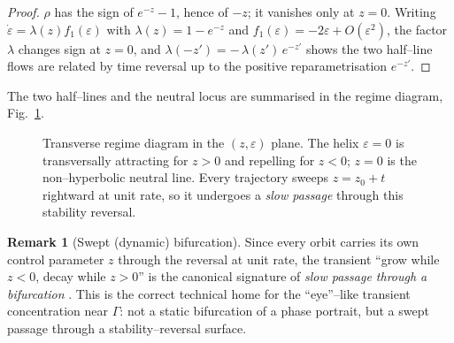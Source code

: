\documentclass[11pt]{article}
\theoremstyle{plain}
\theoremstyle{definition}
\newtheorem{remark}[theorem]{Remark}
\newcommand{\eps}{\varepsilon}
\newcommand{\Gam}{\Gamma}
\begin{document}
\begin{proof}
$\rho$ has the sign of $e^{-z}-1$, hence of $-z$; it vanishes only at $z=0$.
Writing $\dot\eps=\lambda(z)f_1(\eps)$ with $\lambda(z)=1-e^{-z}$ and
$f_1(\eps)=-2\eps+O(\eps^2)$, the factor $\lambda$ changes sign at $z=0$, and
$\lambda(-z')=-\,\lambda(z')\,e^{-z'}$ shows the two half--line flows are
related by time reversal up to the positive reparametrisation $e^{-z'}$.
\end{proof}

\noindent The two half--lines and the neutral locus are summarised in the
regime diagram, Fig.~\ref{fig:regime}.

\begin{figure}[t]
\centering
{}
\caption{Transverse regime diagram in the $(z,\eps)$ plane. The helix
$\eps=0$ is transversally attracting for $z>0$ and repelling for $z<0$;
$z=0$ is the non--hyperbolic neutral line. Every trajectory sweeps
$z=z_0+t$ rightward at unit rate, so it undergoes a \emph{slow passage}
through this stability reversal.}
\label{fig:regime}
\end{figure}

\begin{remark}[Swept (dynamic) bifurcation]
Since every orbit carries its own control parameter $z$ through the reversal
at unit rate, the transient ``grow while $z<0$, decay while $z>0$'' is the
canonical signature of \emph{slow passage through a bifurcation}
\cite{Kuznetsov}. This is the correct technical home for the ``eye''--like
transient concentration near $\Gam$: not a static bifurcation of a phase
portrait, but a swept passage through a stability--reversal surface.
\end{remark}
\end{document}
